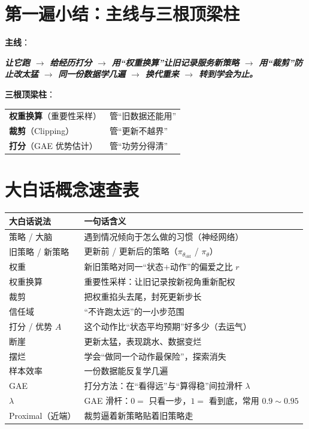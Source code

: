 \documentclass[UTF8,12pt,a4paper]{ctexrep}
\newcommand{\flow}[1]{\par\medskip\noindent
  \begin{tcolorbox}[colback=main!6,colframe=main!6,boxrule=0pt,arc=2pt,
    left=8pt,right=8pt,top=5pt,bottom=5pt,halign=center,
    before skip=8pt,after skip=8pt]
    \color{main!85!black}\bfseries #1
  \end{tcolorbox}\par\medskip}
\begin{document}
\section{第一遍小结：主线与三根顶梁柱}

\textbf{主线}：
\flow{\emph{让它跑 $\to$ 给经历打分 $\to$ 用``权重换算''让旧记录服务新策略 $\to$ 用``裁剪''防止改太猛 $\to$ 同一份数据学几遍 $\to$ 换代重来 $\to$ 转到学会为止。}}

\textbf{三根顶梁柱}：
\begin{center}
\begin{tabular}{ll}
\toprule
\textbf{权重换算}（重要性采样）& 管``旧数据还能用''\\
\textbf{裁剪}（Clipping）& 管``更新不越界''\\
\textbf{打分}（GAE 优势估计）& 管``功劳分得清''\\
\bottomrule
\end{tabular}
\end{center}


\section{大白话概念速查表}

\begin{center}
\small
{}
\begin{tabular}{p{3.2cm}p{9.5cm}}
\toprule
\textbf{大白话说法} & \textbf{一句话含义}\\
\midrule
策略 / 大脑 & 遇到情况倾向于怎么做的习惯（神经网络）\\
旧策略 / 新策略 & 更新前 / 更新后的策略（$\pi_{\theta_{\mathrm{old}}}$ / $\pi_\theta$）\\
权重 & 新旧策略对同一``状态$+$动作''的偏爱之比 $r$\\
权重换算 & 重要性采样：让旧记录按新视角重新配权\\
裁剪 & 把权重掐头去尾，封死更新步长\\
信任域 & ``不许跑太远''的一小步范围\\
打分 / 优势 $A$ & 这个动作比``状态平均预期''好多少（去运气）\\
断崖 & 更新太猛，表现跳水、数据变烂\\
摆烂 & 学会``做同一个动作最保险''，探索消失\\
样本效率 & 一份数据能反复学几遍\\
GAE & 打分方法：在``看得远''与``算得稳''间拉滑杆 $\lambda$\\
$\lambda$ & GAE 滑杆：$0=$ 只看一步，$1=$ 看到底，常用 $0.9\sim0.95$\\
Proximal（近端）& 裁剪逼着新策略贴着旧策略走\\
\bottomrule
\end{tabular}
\end{center}
\end{document}

